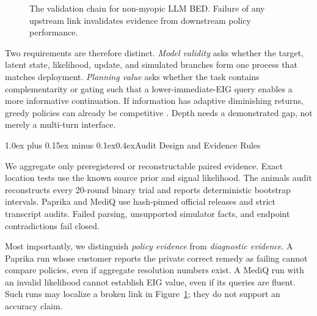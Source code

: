 \documentclass[10pt]{article}
\makeatletter
\renewcommand\section{\@startsection{section}{1}{0pt}%
  {1.0ex plus 0.15ex minus 0.1ex}{0.4ex}{\normalfont\Large\bfseries}}
\makeatother
\begin{document}
\begin{figure}[tbp]
\centering
{}
\caption{The validation chain for non-myopic LLM BED. Failure of any upstream
link invalidates evidence from downstream policy performance.}
\label{fig:validation-chain}
\end{figure}

Two requirements are therefore distinct. \emph{Model validity} asks whether the
target, latent state, likelihood, update, and simulated branches form one process
that matches deployment. \emph{Planning value} asks whether the task contains
complementarity or gating such that a lower-immediate-EIG query enables a more
informative continuation. If information has adaptive diminishing returns,
greedy policies can already be competitive \citep{golovin2011adaptive}. Depth
needs a demonstrated gap, not merely a multi-turn interface.

\section{Audit Design and Evidence Rules}

We aggregate only preregistered or reconstructable paired evidence. Exact
location tests use the known source prior and signal likelihood. The animals
audit reconstructs every 20-round binary trial and reports deterministic
bootstrap intervals. Paprika and MediQ use hash-pinned official releases and
strict transcript audits. Failed parsing, unsupported simulator facts, and
endpoint contradictions fail closed.

Most importantly, we distinguish \emph{policy evidence} from \emph{diagnostic
evidence}. A Paprika run whose customer reports the private correct remedy as
failing cannot compare policies, even if aggregate resolution numbers exist.
A MediQ run with an invalid likelihood cannot establish EIG value, even if its
queries are fluent. Such runs may localize a broken link in
Figure~\ref{fig:validation-chain}; they do not support an accuracy claim.
\end{document}
